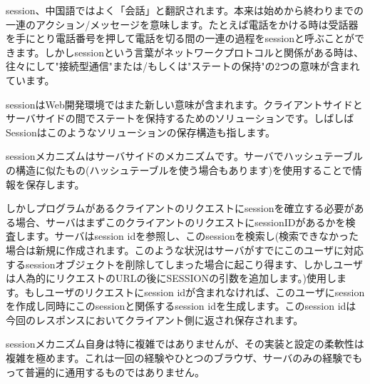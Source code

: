 session、中国語ではよく「会話」と翻訳されます。本来は始めから終わりまでの一連のアクション/メッセージを意味します。たとえば電話をかける時は受話器を手にとり電話番号を押して電話を切る間の一連の過程をsessionと呼ぶことができます。しかしsessionという言葉がネットワークプロトコルと関係がある時は、往々にして"接続型通信"または/もしくは"ステートの保持"の2つの意味が含まれています。

sessionはWeb開発環境ではまた新しい意味が含まれます。クライアントサイドとサーバサイドの間でステートを保持するためのソリューションです。しばしばSessionはこのようなソリューションの保存構造も指します。

sessionメカニズムはサーバサイドのメカニズムです。サーバでハッシュテーブルの構造に似たもの(ハッシュテーブルを使う場合もあります)を使用することで情報を保存します。

しかしプログラムがあるクライアントのリクエストにsessionを確立する必要がある場合、サーバはまずこのクライアントのリクエストにsessionIDがあるかを検査します。サーバはsession idを参照し、このsessionを検索し(検索できなかった場合は新規に作成されます。このような状況はサーバがすでにこのユーザに対応するsessionオブジェクトを削除してしまった場合に起こり得ます、しかしユーザは人為的にリクエストのURLの後にSESSIONの引数を追加します。)使用します。もしユーザのリクエストにsession idが含まれなければ、このユーザにsessionを作成し同時にこのsessionと関係するsession idを生成します。このsession idは今回のレスポンスにおいてクライアント側に返され保存されます。

sessionメカニズム自身は特に複雑ではありませんが、その実装と設定の柔軟性は複雑を極めます。これは一回の経験やひとつのブラウザ、サーバのみの経験でもって普遍的に通用するものではありません。
